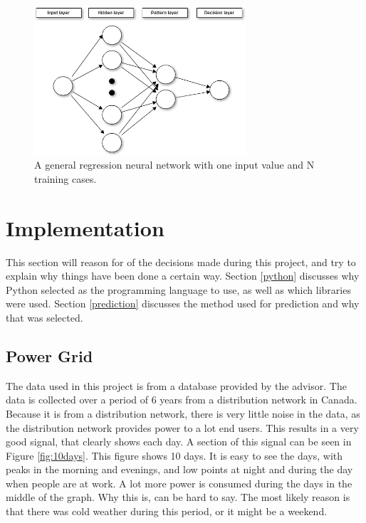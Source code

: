 \documentclass[12pt]{article}
\begin{document}
\begin{figure}[h]
\centering
\includegraphics[width = 0.7\textwidth]{grnn}
\caption{A general regression neural network with one input value and N training cases.}
\label{fig:grnn}
\end{figure}


\section{Implementation}
\label{implementation}
This section will reason for of the decisions made during this project, and try to explain why things have been done a certain way. Section \ref{python} discusses why Python selected as the programming language to use, as well as which libraries were used. Section \ref{prediction} discusses the method used for prediction and why that was selected.

\subsection{Power Grid}
\label{powergrid}
The data used in this project is from a database provided by the advisor. The data is collected over a period of 6 years from a distribution network in Canada. Because it is from a distribution network, there is very little noise in the data, as the distribution network provides power to a lot end users. This results in a very good signal, that clearly shows each day. A section of this signal can be seen in Figure \ref{fig:10days}. This figure shows 10 days. It is easy to see the days, with peaks in the morning and evenings, and low points at night and during the day when people are at work. A lot more power is consumed during the days in the middle of the graph. Why this is, can be hard to say. The most likely reason is that there was cold weather during this period, or it might be a weekend.
\end{document}
